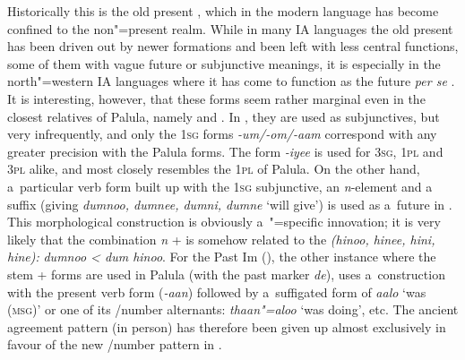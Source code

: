 Historically this is the old present , which in the modern language has become confined to the non"=present  realm. While in many IA languages the old present has been driven out by newer formations and been left with less central functions, some of them with vague future or subjunctive meanings, it is especially in the north"=western IA languages where it has come to function as the future \textit{per se} \citep[288]{masica1991}. It is interesting, however, that these forms seem rather marginal even in the closest relatives of Palula, namely \iliSauji and \iliKalkoti. In \iliSauji, they are used as subjunctives, but very infrequently, and only the \textsc{1sg} forms \textit{-um/-om/-aam} correspond with any greater precision with the Palula forms. The form \textit{-iyee} is used for \textsc{3sg}, \textsc{1pl} and \textsc{3pl} alike, and most closely resembles the \textsc{1pl} of Palula. On the other hand, a~particular verb form built up with the \textsc{1sg} subjunctive, an \textit{n}-element and a~ suffix (giving \textit{dumnoo, dumnee, dumni, dumne} `will give') is used as a~future in \iliSauji. This morphological construction is obviously a~\iliSauji"=specific innovation; it is very likely that the combination \textit{n} +  is somehow related to the  \textit{(hinoo, hinee, hini, hine):} \textit{dumnoo {\textless} dum hinoo}. For the Past Im (), the other instance where the  stem +  forms are used in Palula (with the past  marker \textit{de}), \iliSauji uses a~construction with the present  verb form (\textit{-aan}) followed by a~suffigated form of \textit{aalo} `was \textsc{(msg)}' or one of its /number alternants: \textit{thaan"=aloo} `was doing', etc. The ancient agreement pattern (in person) has therefore been given up almost exclusively in favour of the new /number pattern in \iliSauji \citep[46--54]{buddruss1967}.


